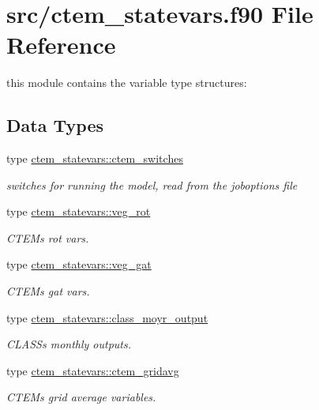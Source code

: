 \hypertarget{ctem__statevars_8f90}{}\section{src/ctem\+\_\+statevars.f90 File Reference}
\label{ctem__statevars_8f90}


this module contains the variable type structures\+:  


\subsection*{Data Types}
\begin{DoxyCompactItemize}
\item 
type \hyperlink{structctem__statevars_1_1ctem__switches}{ctem\+\_\+statevars\+::ctem\+\_\+switches}
\begin{DoxyCompactList}\small\item\em switches for running the model, read from the joboptions file \end{DoxyCompactList}\item 
type \hyperlink{structctem__statevars_1_1veg__rot}{ctem\+\_\+statevars\+::veg\+\_\+rot}
\begin{DoxyCompactList}\small\item\em C\+T\+E\+M\textquotesingle{}s \textquotesingle{}rot\textquotesingle{} vars. \end{DoxyCompactList}\item 
type \hyperlink{structctem__statevars_1_1veg__gat}{ctem\+\_\+statevars\+::veg\+\_\+gat}
\begin{DoxyCompactList}\small\item\em C\+T\+E\+M\textquotesingle{}s \textquotesingle{}gat\textquotesingle{} vars. \end{DoxyCompactList}\item 
type \hyperlink{structctem__statevars_1_1class__moyr__output}{ctem\+\_\+statevars\+::class\+\_\+moyr\+\_\+output}
\begin{DoxyCompactList}\small\item\em C\+L\+A\+S\+S\textquotesingle{}s monthly outputs. \end{DoxyCompactList}\item 
type \hyperlink{structctem__statevars_1_1ctem__gridavg}{ctem\+\_\+statevars\+::ctem\+\_\+gridavg}
\begin{DoxyCompactList}\small\item\em C\+T\+E\+M\textquotesingle{}s grid average variables. \end{DoxyCompactList}\item 

\end{DoxyCompactItemize}
